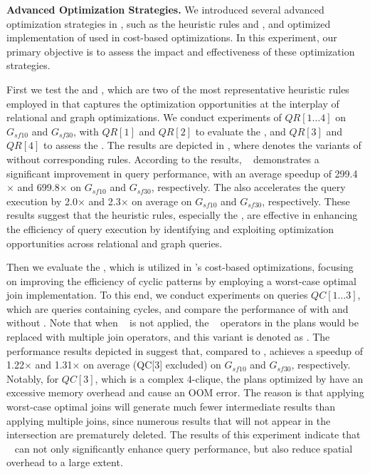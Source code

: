 \noindent\textbf{Advanced Optimization Strategies.}
We introduced several advanced optimization strategies in \name, such as the heuristic rules \filterrule and \joinfuserule, and optimized implementation of \expandintersectrule used in cost-based optimizations.
In this experiment, our primary objective is to assess the impact and effectiveness of these optimization strategies.

First we test the \filterrule and \joinfuserule, which are two of the most representative heuristic rules employed in \name that captures the optimization opportunities at the interplay of relational and graph optimizations.
We conduct experiments of $QR[1\dots 4]$ on $G_{sf10}$ and $G_{sf30}$, with $QR[1]$ and $QR[2]$ to evaluate the \filterrule, and $QR[3]$ and $QR[4]$ to assess the \joinfuserule.
The results are depicted in , where \relgonofi denotes the variants of \name without corresponding rules.
According to the results, \filterrule~ demonstrates a significant improvement in query performance, with an average speedup of 299.4$\times$ and 699.8$\times$ on $G_{sf10}$ and $G_{sf30}$, respectively.
The \joinfuserule also accelerates the query execution by 2.0$\times$ and 2.3$\times$ on average on $G_{sf10}$ and $G_{sf30}$, respectively.
These results suggest that the heuristic rules, especially the \filterrule, are effective in enhancing the efficiency of query execution by identifying and exploiting optimization opportunities across relational and graph queries.

Then we evaluate the \expandintersectrule, which is utilized in \name's cost-based optimizations, focusing on improving the efficiency of cyclic patterns by employing a worst-case optimal join implementation.
To this end, we conduct experiments on queries $QC[1\ldots 3]$, which are queries containing cycles, and compare the performance of \name with and without \expandintersectrule.
Note that when \expandintersectrule~ is not applied, the \intersect~ operators in the plans would be replaced with multiple join operators, and this variant is denoted as \relgomj.
The performance results depicted in  suggest that, compared to \relgomj, \name achieves a speedup of 1.22$\times$ and 1.31$\times$ on average (QC[3] excluded) on $G_{sf10}$ and $G_{sf30}$, respectively.
Notably, for $QC[3]$, which is a complex 4-clique, the plans optimized by \relgomj have an excessive memory overhead and cause an OOM error.
The reason is that applying worst-case optimal joins will generate much fewer intermediate results than applying multiple joins, since numerous results that will not appear in the intersection are prematurely deleted.
The results of this experiment indicate that \expandintersectrule~ can not only significantly enhance query performance, but also reduce spatial overhead to a large extent.

